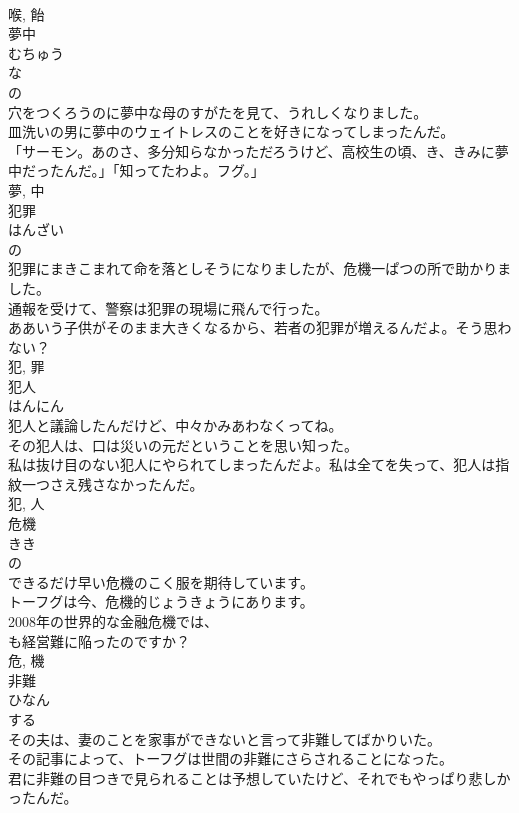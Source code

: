 \documentclass[8pt]{extreport}
\begin{document}
\begin{CJK}{UTF8}{min}
\\	喉, 飴	
\\	夢中	
\\	むちゅう	
\\	な 
\\	の 
\\	穴をつくろうのに夢中な母のすがたを見て、うれしくなりました。	
\\	皿洗いの男に夢中のウェイトレスのことを好きになってしまったんだ。	
\\	「サーモン。あのさ、多分知らなかっただろうけど、高校生の頃、き、きみに夢中だったんだ。」「知ってたわよ。フグ。」	
\\	夢, 中	
\\	犯罪	
\\	はんざい	
\\	の 
\\	犯罪にまきこまれて命を落としそうになりましたが、危機一ぱつの所で助かりました。	
\\	通報を受けて、警察は犯罪の現場に飛んで行った。	
\\	ああいう子供がそのまま大きくなるから、若者の犯罪が増えるんだよ。そう思わない？	
\\	犯, 罪	
\\	犯人	
\\	はんにん	
\\	犯人と議論したんだけど、中々かみあわなくってね。	
\\	その犯人は、口は災いの元だということを思い知った。	
\\	私は抜け目のない犯人にやられてしまったんだよ。私は全てを失って、犯人は指紋一つさえ残さなかったんだ。	
\\	犯, 人	
\\	危機	
\\	きき	
\\	の 
\\	できるだけ早い危機のこく服を期待しています。	
\\	トーフグは今、危機的じょうきょうにあります。	
\\	2008年の世界的な金融危機では、
\\	も経営難に陥ったのですか？	
\\	危, 機	
\\	非難	
\\	ひなん	
\\	する 
\\	その夫は、妻のことを家事ができないと言って非難してばかりいた。	
\\	その記事によって、トーフグは世間の非難にさらされることになった。	
\\	君に非難の目つきで見られることは予想していたけど、それでもやっぱり悲しかったんだ。	

\end{CJK}
\end{document}
